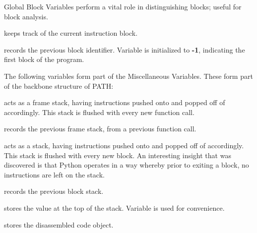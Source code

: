             \begin{description}
                \item Global Block Variables perform a vital role in distinguishing blocks; useful for block analysis.
                \item[block\_identifier] keeps track of the current instruction block.
                \item[prev\_block\_identifier] records the previous block identifier. Variable is initialized to {\bfseries-1}, indicating the first block of the program.
            \end{description}

            \begin{description}
                \item The following variables form part of the Miscellaneous Variables. These form part of the backbone structure of \acs{PATH}:
                \item[frame\_stack] acts as a frame stack, having instructions pushed onto and popped off of accordingly. This stack is flushed with every new function call.
                \item[prev\_frame\_stack] records the previous frame stack, from a previous function call. %
                \item[block\_stack] acts as a stack, having instructions pushed onto and popped off of accordingly. This stack is flushed with every new block. An interesting insight that was discovered is that Python operates in a way whereby prior to exiting a block, no instructions are left on the stack.
                \item[prev\_block\_stack] records the previous block stack.
                \item[tos] stores the value at the top of the stack. Variable is used for convenience.
                \item[bytecode] stores the disassembled code object.  
            \end{description}
